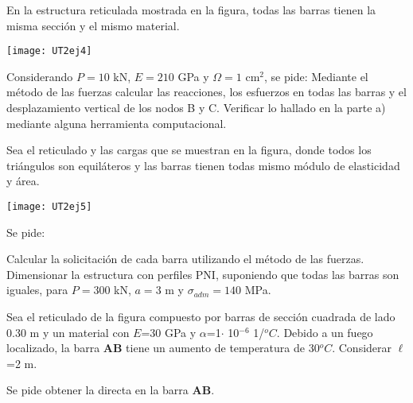 \ejercicio

En la estructura reticulada mostrada en la figura, todas las barras tienen la misma sección y el mismo material.

\begin{center}
	\texttt{[image: UT2ej4]}
\end{center}

Considerando  $P=10$ kN, $E=210$ GPa y $\Omega=1$ cm$^2$, se pide:
%
\parte Mediante el método de las fuerzas calcular las reacciones, los esfuerzos en todas las barras y el desplazamiento vertical de los nodos B y C. 
%
\parte Verificar lo hallado en la parte a) mediante alguna herramienta computacional.


\ejercicio
Sea el reticulado y las cargas que se muestran en la figura, donde todos los triángulos son equiláteros y las barras tienen todas mismo módulo de elasticidad y área.

\begin{center}
	\texttt{[image: UT2ej5]}
\end{center}

Se pide:

\parte Calcular la solicitación de cada barra utilizando el método de las fuerzas.
\parte Dimensionar la estructura con perfiles PNI, suponiendo que todas las barras son iguales, para $P=300$ kN, $a=3$ m y $\sigma_{adm}=140$ MPa.

\ejercicio
Sea el reticulado de la figura compuesto por barras de sección cuadrada de lado 0.30 m y un material con $E$=30 GPa y $\alpha$=1$\cdot$ 10$^{-6}$ 1/$^oC$. Debido a un fuego localizado, la barra \textbf{AB} tiene un aumento de temperatura de 30$^oC$. Considerar $\ell$=2 m.

\begin{center}
	\def\svgwidth{0.7\textwidth}
	
\end{center} 

Se pide obtener la directa en la barra \textbf{AB}.